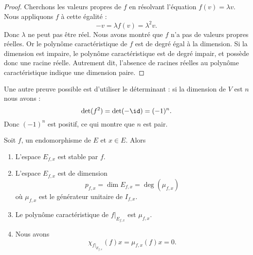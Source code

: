 \begin{proof}
    Cherchons les valeurs propres de \( f\) en résolvant l'équation \( f(v)=\lambda v\). Nous appliquons \( f\) à cette égalité :
    \begin{equation}
        -v=\lambda f(v)=\lambda^2v.
    \end{equation}
    Donc \( \lambda\) ne peut pas être réel. Nous avons montré que \( f\) n'a pas de valeurs propres réelles. Or le polynôme caractéristique de \( f\) est de degré égal à la dimension. Si la dimension est impaire, le polynôme caractéristique est de degré impair, et possède donc une racine réelle. Autrement dit, l'absence de racines réelles au polynôme caractéristique indique une dimension paire.
\end{proof}

Une autre preuve possible est d'utiliser le déterminant : si la dimension de \( V\) est \( n\) nous avons :
\begin{equation}
    \det(f^2)=\det(-\id)=(-1)^n.
\end{equation}
Donc \( (-1)^n\) est positif, ce qui montre que \( n\) est pair.

\begin{proposition}\label{PropNrZGhT}
    Soit \( f\), un endomorphisme de \( E\) et \( x\in E\). Alors
    \begin{enumerate}
        \item
            L'espace \( E_{f,x}\) est stable par \( f\).
        \item\label{ItemfzKOCo}
            L'espace \( E_{f,x}\) est de dimension
            \begin{equation}
                p_{f,x}=\dim E_{f,x}=\deg(\mu_{f,x})
            \end{equation}
            où \( \mu_{f,x}\) est le générateur unitaire de \( I_{f,x}\).
        \item   \label{ItemKHNExH}
            Le polynôme caractéristique de \( f|_{E_{f,x}}\) est \( \mu_{f,x}\).
        \item   \label{ItemHMviZw}
            Nous avons
            \begin{equation}
                \chi_{f|_{E_{f,x}}}(f)x=\mu_{f,x}(f)x=0.
            \end{equation}
    \end{enumerate}
\end{proposition}

